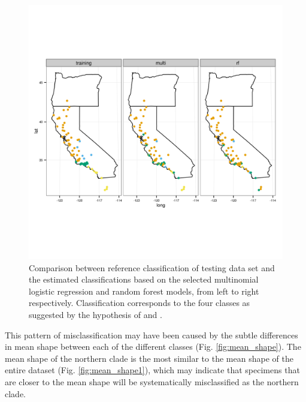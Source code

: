 \documentclass[12pt,letterpaper]{article}\usepackage{graphicx, color}
\begin{document}
\begin{figure}[ht]
  \centering
  \includegraphics[width = \textwidth]{figure/gen_map}
  \caption{Comparison between reference classification of testing data set and the estimated classifications based on the selected multinomial logistic regression and random forest models, from left to right respectively. Classification corresponds to the four classes as suggested by the hypothesis of \citet{Spinks2005} and \citet{Spinks2010}.}
  \label{fig:gen_map}
\end{figure}

This pattern of misclassification may have been caused by the subtle differences in mean shape between each of the different classes (Fig. \ref{fig:mean_shape}). The mean shape of the northern clade is the most similar to the mean shape of the entire dataset (Fig. \ref{fig:mean_shape1}), which may indicate that specimens that are closer to the mean shape will be systematically misclassified as the northern clade.
\end{document}
